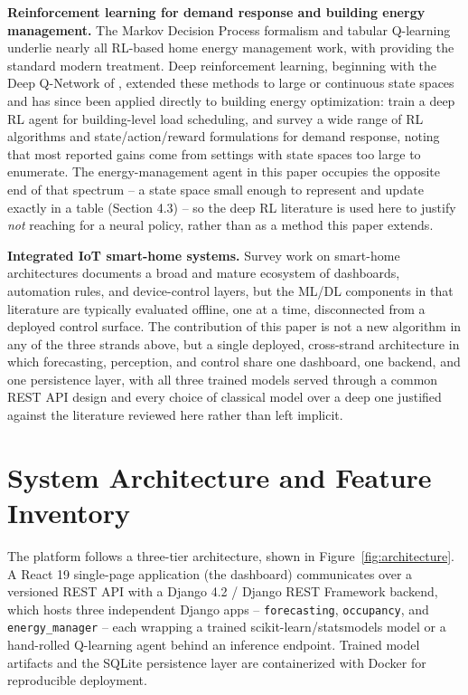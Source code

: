 \documentclass[11pt,a4paper]{article}
\begin{document}
\textbf{Reinforcement learning for demand response and building energy management.} The Markov Decision Process formalism \citep{bellman1957} and tabular Q-learning \citep{watkins1989,watkins1992} underlie nearly all RL-based home energy management work, with \citet{sutton2018} providing the standard modern treatment. Deep reinforcement learning, beginning with the Deep Q-Network of \citet{mnih2015}, extended these methods to large or continuous state spaces and has since been applied directly to building energy optimization: \citet{mocanu2019} train a deep RL agent for building-level load scheduling, and \citet{vazquezcanteli2019} survey a wide range of RL algorithms and state/action/reward formulations for demand response, noting that most reported gains come from settings with state spaces too large to enumerate. The energy-management agent in this paper occupies the opposite end of that spectrum -- a state space small enough to represent and update exactly in a table (Section 4.3) -- so the deep RL literature is used here to justify \emph{not} reaching for a neural policy, rather than as a method this paper extends.

\textbf{Integrated IoT smart-home systems.} Survey work on smart-home architectures \citep{alaa2017} documents a broad and mature ecosystem of dashboards, automation rules, and device-control layers, but the ML/DL components in that literature are typically evaluated offline, one at a time, disconnected from a deployed control surface. The contribution of this paper is not a new algorithm in any of the three strands above, but a single deployed, cross-strand architecture in which forecasting, perception, and control share one dashboard, one backend, and one persistence layer, with all three trained models served through a common REST API design and every choice of classical model over a deep one justified against the literature reviewed here rather than left implicit.

\section{System Architecture and Feature Inventory}

The platform follows a three-tier architecture, shown in Figure~\ref{fig:architecture}. A React 19 single-page application (the dashboard) communicates over a versioned REST API with a Django 4.2 / Django REST Framework backend, which hosts three independent Django apps -- \texttt{forecasting}, \texttt{occupancy}, and \texttt{energy\_manager} -- each wrapping a trained scikit-learn/statsmodels model or a hand-rolled Q-learning agent behind an inference endpoint. Trained model artifacts and the SQLite persistence layer are containerized with Docker for reproducible deployment.
\end{document}
